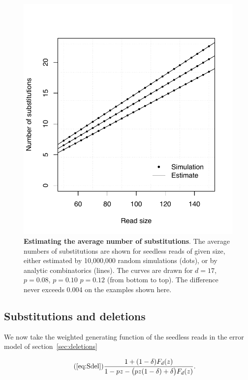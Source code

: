 \documentclass{article}
\begin{document}
\begin{figure}[h]
\centering
\includegraphics[scale=0.445]{simulp-average.pdf}
\caption{\textbf{Estimating the average number of substitutions}.
The average numbers of substitutions are shown for seedless reads of given
size, either estimated by 10,000,000 random simulations (dots), or by
analytic combinatorics (lines). The curves are drawn for $d=17$, $p=0.08$,
$p=0.10$ $p=0.12$ (from bottom to top). The difference never exceeds 0.004
on the examples shown here.}
\label{fig:simulavsub}
\end{figure}





\subsection{Substitutions and deletions}
\label{sec:avdel}

We now take the weighted generating function of the seedless reads in the
error model of section~\ref{sec:deletions}

\begin{equation}
\tag{\ref{eq:Sdel}}
\frac{1+(1-\delta)F_d(z)}
  {1-pz - \big(pz(1-\delta) + \delta\big)F_d(z)}.
\end{equation}
\end{document}
